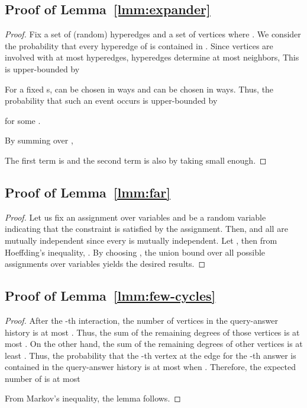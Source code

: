 \documentclass[letterpaper,11pt]{article}
\begin{document}
\subsection{Proof of Lemma~\ref{lmm:expander}}\label{apx:expander}
\begin{proof}
  Fix a set of  (random) hyperedges  and a set of  vertices  where .
  We consider the probability that every hyperedge of  is contained in .
  Since  vertices are involved with at most  hyperedges,  hyperedges determine at most  neighbors, 
  This is upper-bounded by 
  
  
  For a fixed s,  can be chosen in  ways and  can be chosen in  ways.
  Thus, the probability that such an event occurs is upper-bounded by 
  
  for some .

  By summing over ,
  
  The first term is  and the second term is also  by taking  small enough.
\end{proof}

\subsection{Proof of Lemma~\ref{lmm:far}}\label{apx:far}
\begin{proof}
  Let us fix an assignment  over variables and  be a random variable indicating that the constraint  is satisfied by the assignment.
  Then,  and all  are mutually independent since every  is mutually independent.
  Let , 
  then from Hoeffding's inequality, .
  By choosing , 
  the union bound over all  possible assignments over variables yields the desired results.
\end{proof}

\subsection{Proof of Lemma~\ref{lmm:few-cycles}}\label{apx:few-cycles}
\begin{proof}
  After the -th interaction,
  the number of vertices in the query-answer history is at most .
  Thus, the sum of the remaining degrees of those vertices is at most .
  On the other hand, the sum of the remaining degrees of other vertices is at least .
  Thus, the probability that the -th vertex  at the edge for the -th answer is contained in the query-answer history is at most  when .
  Therefore, the expected number of  is at most 
  
  From Markov's inequality, the lemma follows.
\end{proof}
\end{document}
